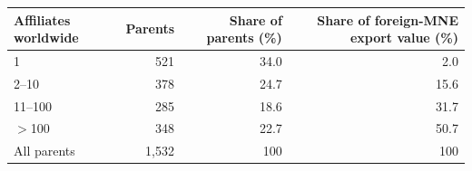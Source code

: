 \begin{tabular}{lrrr}
\toprule
Affiliates worldwide & Parents & Share of parents (\%) & Share of foreign-MNE export value (\%) \\
\midrule
1 & 521 & 34.0 & 2.0 \\
2--10 & 378 & 24.7 & 15.6 \\
11--100 & 285 & 18.6 & 31.7 \\
$>$100 & 348 & 22.7 & 50.7 \\
\midrule
All parents & 1,532 & 100 & 100 \\
\bottomrule
\end{tabular}
